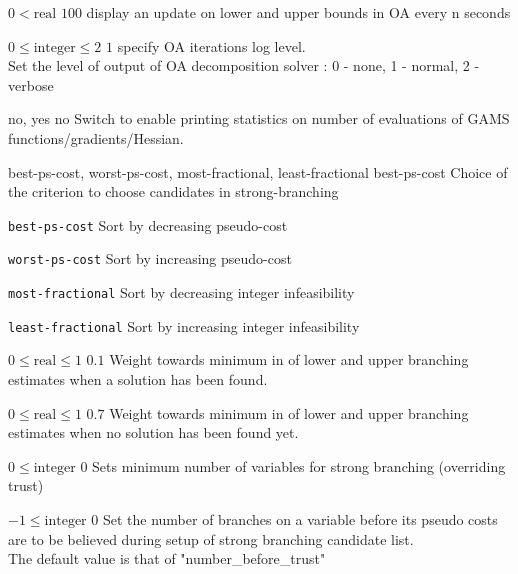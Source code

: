 %
{$0<\textrm{real}$}%
{$100$}%
{display an update on lower and upper bounds in OA every n seconds}%
{}

%
{$0\leq\textrm{integer}\leq2$}%
{$1$}%
{specify OA iterations log level.\\
Set the level of output of OA decomposition solver : 0 - none, 1 - normal, 2 - verbose}%
{}

%
{\ttfamily no, yes}%
{no}%
{Switch to enable printing statistics on number of evaluations of GAMS functions/gradients/Hessian.}%
{}

%
{\ttfamily best-ps-cost, worst-ps-cost, most-fractional, least-fractional}%
{best-ps-cost}%
{Choice of the criterion to choose candidates in strong-branching}%
{\begin{list}{}{
\setlength{\parsep}{0em}
\setlength{\leftmargin}{5ex}
\setlength{\labelwidth}{2ex}
\setlength{\itemindent}{0ex}
\setlength{\topsep}{0pt}}
\item[\texttt{best-ps-cost}] Sort by decreasing pseudo-cost
\item[\texttt{worst-ps-cost}] Sort by increasing pseudo-cost
\item[\texttt{most-fractional}] Sort by decreasing integer infeasibility
\item[\texttt{least-fractional}] Sort by increasing integer infeasibility
\end{list}
}

%
{$0\leq\textrm{real}\leq1$}%
{$0.1$}%
{Weight towards minimum in of lower and upper branching estimates when a solution has been found.}%
{}

%
{$0\leq\textrm{real}\leq1$}%
{$0.7$}%
{Weight towards minimum in of lower and upper branching estimates when no solution has been found yet.}%
{}

%
{$0\leq\textrm{integer}$}%
{$0$}%
{Sets minimum number of variables for strong branching (overriding trust)}%
{}

%
{$-1\leq\textrm{integer}$}%
{$0$}%
{Set the number of branches on a variable before its pseudo costs are to be believed during setup of strong branching candidate list.\\
The default value is that of "number\_before\_trust"}%
{}


